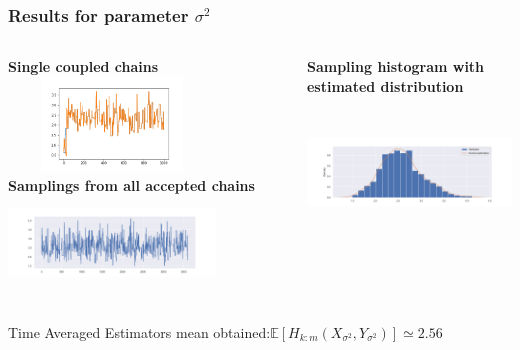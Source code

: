 \documentclass{beamer}
\begin{document}
\begin{frame}
	\frametitle{Results for parameter $\sigma^2$}
	\begin{columns}
		\begin{column}{0.4\textwidth}
			{\scriptsize \textbf{Single coupled chains}}\\
			\includegraphics[width=5.5cm,height=2.5cm]{doublecoupling_chainmeeting/doublecoupling_sigma_chain_meeting}
			\vspace{0.2cm}
			{	\scriptsize \textbf{Samplings from all accepted chains }}\\
			\includegraphics[width=5.5cm,height=2.5cm]{doublecoupling_pack/doublecoupling_sampling_sigma}
		\end{column}
		\begin{column}{0.4\textwidth}
			{\scriptsize \textbf{Sampling histogram with estimated distribution}}\\
			\includegraphics[width=6cm,height=4cm]{doublecoupling_pack/doublecoupling_sigma_histogram_kernel}
		\end{column}
	\end{columns}
	
	\small
	Time Averaged Estimators mean obtained:$\mathbb{E}[H_{k:m}(X_{\sigma^2}, Y_{\sigma^2})] \simeq 2.56   %
	$
	
\end{frame}

	
\end{document}
